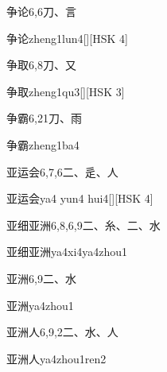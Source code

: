 \begin{entry}{争论}{6,6}{⼑、⾔}
  \begin{phonetics}{争论}{zheng1lun4}[][HSK 4]
  \end{phonetics}
\end{entry}

\begin{entry}{争取}{6,8}{⼑、⼜}
  \begin{phonetics}{争取}{zheng1qu3}[][HSK 3]
  \end{phonetics}
\end{entry}

\begin{entry}{争霸}{6,21}{⼑、⾬}
  \begin{phonetics}{争霸}{zheng1ba4}
  \end{phonetics}
\end{entry}

\begin{entry}{亚运会}{6,7,6}{⼆、⾡、⼈}
  \begin{phonetics}{亚运会}{ya4 yun4 hui4}[][HSK 4]
  \end{phonetics}
\end{entry}

\begin{entry}{亚细亚洲}{6,8,6,9}{⼆、⽷、⼆、⽔}
  \begin{phonetics}{亚细亚洲}{ya4xi4ya4zhou1}
  \end{phonetics}
\end{entry}

\begin{entry}{亚洲}{6,9}{⼆、⽔}
  \begin{phonetics}{亚洲}{ya4zhou1}
  \end{phonetics}
\end{entry}

\begin{entry}{亚洲人}{6,9,2}{⼆、⽔、⼈}
  \begin{phonetics}{亚洲人}{ya4zhou1ren2}
  \end{phonetics}
\end{entry}

